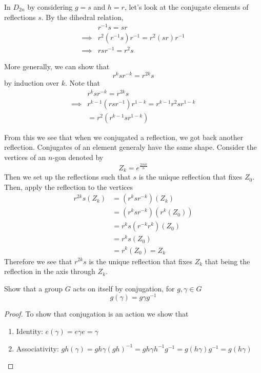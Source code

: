 \documentclass{article}
\begin{document}
\begin{eg}
    In $D_{2n}$ by considering $g = s$ and $h = r$, let's look at the conjugate elements of reflections $s$.
    By the dihedral relation,
    \begin{align*}
        &r^{-1}s = sr \\
        \implies& r^2 (r^{-1} s) r^{-1} = r^2 (sr) r^{-1} \\
        \implies& r s r^{-1} = r^2 s
    \end{align*}

    More generally, we can show that
    \[
        r^k s r^{-k} = r^{2k} s  
    \]
    by induction over $k$. Note that
    \begin{align*}
        &r^k s r^{-k} = r^{2k} s \\
        \implies& r^{k-1} (rsr^{-1}) r^{1-k} = r^{k-1} r^2s r^{1-k} \\
        &=r^2(r^{k - 1} s r^{1-k})
    \end{align*}

    From this we see that when we conjugated a reflection, we got back another reflection. Conjugates of an element generaly have the same shape.
    Consider the vertices of an $n$-gon denoted by
    \[
        Z_k = e^\frac{2\pi i k}{n}  
    \]
    Then we set up the reflections such that $s$ is the unique reflection that fixes $Z_0$. Then, apply the reflection to the vertices
    \begin{align*}
        r^{2k}s (Z_k) &= (r^k s r^{-k})(Z_k) \\
        &= (r^k s r^{-k})(r^k (Z_0)) \\
        &= r^k s (r^{-k}r^k) (Z_0) \\
        &= r^k s (Z_0) \\
        &= r^k (Z_0) = Z_k
    \end{align*}
    Therefore we see that $r^{2k} s$ is the unique reflection that fixes $Z_k$ that being the reflection in the axis through $Z_k$.
\end{eg}

\begin{ex}
    Show that a group $G$ acts on itself by conjugation, for $g, \gamma \in G$
    \[
        g(\gamma) = g \gamma g^{-1}
    \]
\end{ex}

\begin{proof}
    To show that conjugation is an action we show that
    \begin{enumerate}
        \item Identity: $e(\gamma) = e \gamma e = \gamma$
        \item Associativity: $gh(\gamma) = gh \gamma (gh)^{-1} = gh \gamma h^{-1}g^{-1} = g (h\gamma) g^{-1} = g(h\gamma)$
    \end{enumerate}
\end{proof}
\end{document}
